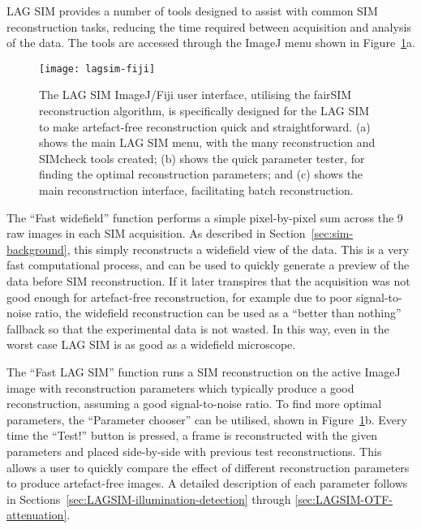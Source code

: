LAG SIM provides a number of tools designed to assist with common SIM reconstruction tasks, reducing the time required between acquisition and analysis of the data.
The tools are accessed through the ImageJ menu shown in Figure~\ref{fig:lagsim-fiji-interface}a.

\begin{figure}[b!]
	\centering
		\texttt{[image: lagsim-fiji]}
	\caption[LAG SIM: A Fiji interface makes artefact-free reconstruction quick and simple for non-expert users]{The LAG SIM ImageJ/Fiji user interface, utilising the fairSIM reconstruction algorithm, is specifically designed for the LAG SIM to make artefact-free reconstruction quick and straightforward. (a) shows the main LAG SIM menu, with the many reconstruction and SIMcheck tools created; (b) shows the quick parameter tester, for finding the optimal reconstruction parameters; and (c) shows the main reconstruction interface, facilitating batch reconstruction. }
\label{fig:lagsim-fiji-interface}
\end{figure}

The ``Fast widefield'' function performs a simple pixel-by-pixel sum across the 9 raw images in each SIM acquisition.
As described in Section~\ref{sec:sim-background}, this simply reconstructs a widefield view of the data.
This is a very fast computational process, and can be used to quickly generate a preview of the data before SIM reconstruction.
If it later transpires that the acquisition was not good enough for artefact-free reconstruction, for example due to poor signal-to-noise ratio, the widefield reconstruction can be used as a ``better than nothing'' fallback so that the experimental data is not wasted.
In this way, even in the worst case LAG SIM is as good as a widefield microscope.

The ``Fast LAG SIM'' function runs a SIM reconstruction on the active ImageJ image with reconstruction parameters which typically produce a good reconstruction, assuming a good signal-to-noise ratio.
To find more optimal parameters, the ``Parameter chooser'' can be utilised, shown in Figure~\ref{fig:lagsim-fiji-interface}b.
Every time the ``Test!'' button is pressed, a frame is reconstructed with the given parameters and placed side-by-side with previous test reconstructions.
This allows a user to quickly compare the effect of different reconstruction parameters to produce artefact-free images.
A detailed description of each parameter follows in Sections~\ref{sec:LAGSIM-illumination-detection} through \ref{sec:LAGSIM-OTF-attenuation}.

